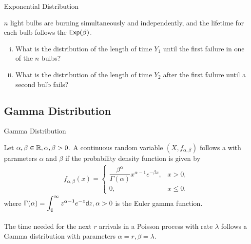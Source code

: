 \begin{frame}{Exponential Distribution}

\justifying
{} $n$ light bulbs are burning simultaneously and independently, and the lifetime for each bulb follows the $\mathsf{Exp}(\beta)$. 
\begin{enumerate}[(i).]
	\justifying
	\item What is the distribution of the length of time $Y_1$ until the first failure in one of the $n$ bulbs?
	\item What is the distribution of the length of time $Y_2$ after the first failure until a second bulb fails?
\end{enumerate}

\end{frame}


\subsection{Gamma Distribution}

\begin{frame}{Gamma Distribution}

 Let $\alpha, \beta \in \mathbb{R}, \alpha, \beta > 0$. A continuous random variable $(X, f_{\alpha, \beta})$ follows a  with parameters $\alpha$ and $\beta$ if the probability density function is given by
\begin{align*}
f_{\alpha, \beta}(x) = \left\{
\begin{array}{ll}
\dfrac{\beta^{\alpha}}{\Gamma(\alpha)} x^{\alpha-1} e^{-\beta x}, & x > 0, \\
0, & x \leq 0.
\end{array}
\right.
\end{align*}
where $\displaystyle\Gamma(\alpha) = \int_0^{\infty} z^{\alpha-1} e^{-z}\mathsf{d}z, \alpha > 0$ is the Euler gamma function. \\
~\\
 The time needed for the next $r$ arrivals in a Poisson process with rate $\lambda$ follows a Gamma distribution with parameters $\alpha = r, \beta = \lambda$.

\end{frame}


